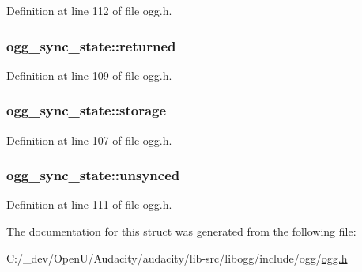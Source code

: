 Definition at line 112 of file ogg.\+h.

\subsubsection[{\texorpdfstring{returned}{returned}}]{ ogg\+\_\+sync\+\_\+state\+::returned}\hypertarget{structogg__sync__state_ac1b56ee81f71737f2f6397907f55a2e9}{}\label{structogg__sync__state_ac1b56ee81f71737f2f6397907f55a2e9}


Definition at line 109 of file ogg.\+h.

\subsubsection[{\texorpdfstring{storage}{storage}}]{ ogg\+\_\+sync\+\_\+state\+::storage}\hypertarget{structogg__sync__state_a15fc1bb5161fc4ae87b7a65982776c24}{}\label{structogg__sync__state_a15fc1bb5161fc4ae87b7a65982776c24}


Definition at line 107 of file ogg.\+h.

\subsubsection[{\texorpdfstring{unsynced}{unsynced}}]{ ogg\+\_\+sync\+\_\+state\+::unsynced}\hypertarget{structogg__sync__state_a8d538bb32400470f00080e2160158a76}{}\label{structogg__sync__state_a8d538bb32400470f00080e2160158a76}


Definition at line 111 of file ogg.\+h.



The documentation for this struct was generated from the following file\+:\begin{DoxyCompactItemize}
\item 
C\+:/\+\_\+dev/\+Open\+U/\+Audacity/audacity/lib-\/src/libogg/include/ogg/\hyperlink{ogg_8h}{ogg.\+h}\end{DoxyCompactItemize}
